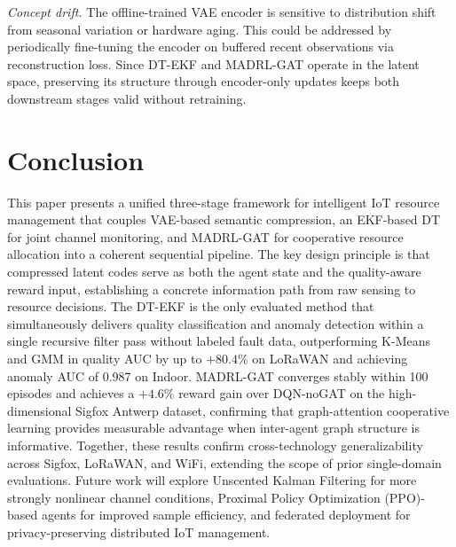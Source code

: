 \documentclass[conference]{IEEEtran}
\begin{document}
\textit{Concept drift.}
The offline-trained VAE encoder is sensitive to distribution shift from seasonal variation or hardware aging. This could be addressed by periodically fine-tuning the encoder on buffered recent observations via reconstruction loss. Since DT-EKF and MADRL-GAT operate in the latent space, preserving its structure through encoder-only updates keeps both downstream stages valid without retraining.

\vspace{-8pt}
\section{Conclusion}
\label{sec:conclusion}

This paper presents a unified three-stage framework for intelligent IoT
resource management that couples VAE-based semantic compression, an
EKF-based DT for joint channel monitoring, and MADRL-GAT for
cooperative resource allocation into a coherent sequential pipeline.
The key design principle is that compressed latent codes serve as both
the agent state and the quality-aware reward input, establishing a
concrete information path from raw sensing to resource decisions.
The DT-EKF is the only evaluated method that simultaneously delivers
quality classification and anomaly detection within a single recursive
filter pass without labeled fault data, outperforming K-Means and GMM
in quality AUC by up to $+80.4\%$ on LoRaWAN and achieving anomaly
AUC of 0.987 on Indoor.
MADRL-GAT converges stably within 100 episodes and achieves a $+4.6\%$
reward gain over DQN-noGAT on the high-dimensional Sigfox Antwerp dataset,
confirming that graph-attention cooperative learning provides measurable advantage when inter-agent graph structure is informative.
Together, these results confirm cross-technology generalizability across
Sigfox, LoRaWAN, and WiFi, extending the scope of prior single-domain evaluations.
Future work will explore Unscented Kalman Filtering for more strongly
nonlinear channel conditions, Proximal Policy Optimization (PPO)-based agents for improved sample
efficiency, and federated deployment for privacy-preserving
distributed IoT management.
\end{document}
